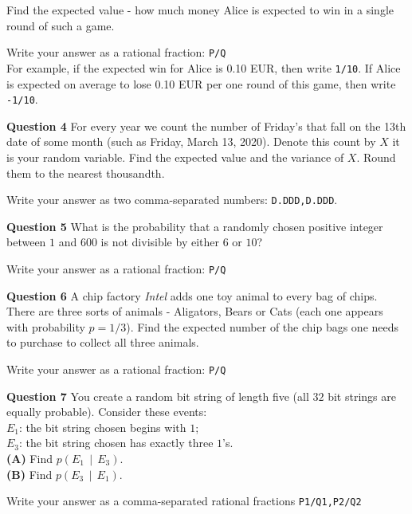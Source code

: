 \documentclass[jou]{apa6}
\begin{document}
Find the expected value - how much money Alice is expected to win in a single round of such a game.

Write your answer as a rational fraction: {\tt P/Q}\\
For example, if the expected win for Alice is 0.10 EUR, then write {\tt 1/10}. If Alice is expected on average to lose 0.10 EUR
per one round of this game, then write {\tt -1/10}. 




\vspace{10pt}
{\bf Question 4} For every year we count the number of Friday's that fall on the 13th date of some month
(such as Friday, March 13, 2020). Denote this count by $X$ \textendash{} it is your random variable.
Find the expected value and the variance of $X$. Round them to the nearest thousandth. 

Write your answer as two comma-separated numbers: {\tt D.DDD,D.DDD}.

\vspace{10pt}
{\bf Question 5} What is the
probability that a randomly chosen positive integer between $1$ and $600$ is not divisible 
by either $6$ or $10$?

Write your answer as a rational fraction: {\tt P/Q}


\vspace{10pt}
{\bf Question 6} A chip factory {\em Intel} adds one toy animal to every bag of chips.
There are three sorts of animals - Aligators, Bears or Cats (each one appears with probability $p=1/3$). 
Find the expected number of the chip bags one needs to purchase to collect all three animals.

Write your answer as a rational fraction: {\tt P/Q}

\vspace{10pt}
{\bf Question 7} You create a random bit string of length five (all $32$ bit strings are equally probable). Consider
these events:\\
$E_1$: the bit string chosen begins with $1$;\\
$E_3$: the bit string chosen has exactly three $1$’s.\\
{\bf (A)} Find $p(E_1 \,\mid\, E_3)$.\\
{\bf (B)} Find $p(E_3 \,\mid\, E_1)$.

Write your answer as a comma-separated rational fractions {\tt P1/Q1,P2/Q2}






\newpage
\end{document}
